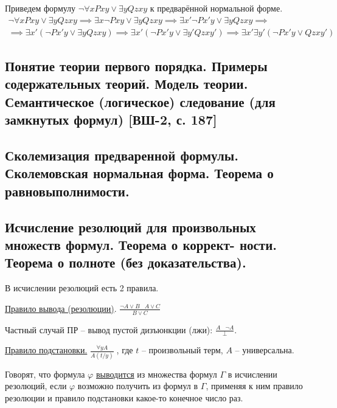 \documentclass[a4paper, fleqn]{article}
\begin{document}
    \begin{example}
        Приведем формулу $\neg \forall x Pxy \vee \exists y Qzxy$ к предварённой нормальной форме.
        \begin{gather*}
            \neg \forall x Pxy \vee \exists y Qzxy \implies \exists x \neg Pxy \vee \exists y Qzxy \implies \exists x' \neg Px'y \vee \exists y Qzxy \implies \\ \implies \exists x' (\neg Px'y \vee \exists y Qzxy) \implies \exists x' (\neg Px'y \vee \exists y' Qzxy') \implies \exists x' \exists y' (\neg Px'y \vee Qzxy')
        \end{gather*}
    \end{example}

    \subsection{Понятие теории первого порядка. Примеры содержательных теорий. Модель теории. Семантическое (логическое) следование (для замкнутых формул) [ВШ-2, с. 187]}

    \subsection{Сколемизация предваренной формулы. Сколемовская нормальная форма. Теорема о равновыполнимости.}

    \subsection{Исчисление резолюций для произвольных множеств формул. Теорема о коррект- ности.
        Теорема о полноте (без доказательства).}

    В исчислении резолюций есть 2 правила.


    \underline{Правило вывода (резолюции)}. $\boxed{\frac{\neg A \lor B \; \; \; A \lor C}{B \lor C} } $

    Частный случай ПР -- вывод пустой дизъюнкции (лжи): $\frac{A \; \; \; \neg A}{\perp}.$



    \underline{Правило подстановки.} $\boxed{\frac{\forall y A}{A(t/y)}} \; $, где $t$ -- произвольный терм, $A$ -- универсальна.


    Говорят, что формула $\varphi$ \underline{выводится} из множества  формул $\Gamma$ в исчислении резолюций, если $\varphi$ возможно получить из формул в $\Gamma$, применяя к ним правило резолюции и правило подстановки какое-то конечное число раз.
\end{document}
